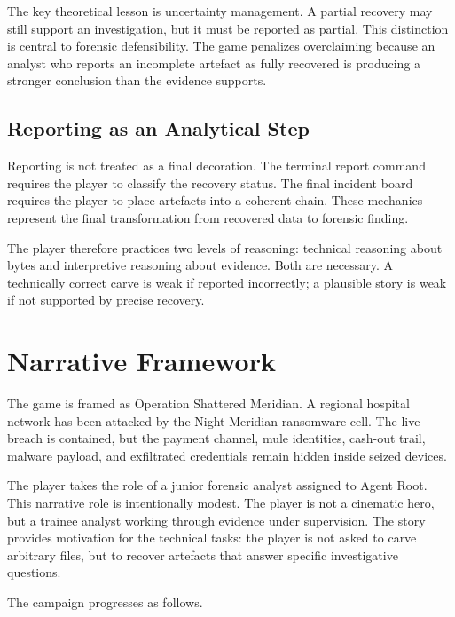 \documentclass[11pt,a4paper]{article}
\begin{document}
The key theoretical lesson is uncertainty management. A partial recovery may still support an investigation, but it must be reported as partial. This distinction is central to forensic defensibility. The game penalizes overclaiming because an analyst who reports an incomplete artefact as fully recovered is producing a stronger conclusion than the evidence supports.

\subsection{Reporting as an Analytical Step}

Reporting is not treated as a final decoration. The terminal report command requires the player to classify the recovery status. The final incident board requires the player to place artefacts into a coherent chain. These mechanics represent the final transformation from recovered data to forensic finding.

The player therefore practices two levels of reasoning: technical reasoning about bytes and interpretive reasoning about evidence. Both are necessary. A technically correct carve is weak if reported incorrectly; a plausible story is weak if not supported by precise recovery.

\section{Narrative Framework}

The game is framed as Operation Shattered Meridian. A regional hospital network has been attacked by the Night Meridian ransomware cell. The live breach is contained, but the payment channel, mule identities, cash-out trail, malware payload, and exfiltrated credentials remain hidden inside seized devices.

The player takes the role of a junior forensic analyst assigned to Agent Root. This narrative role is intentionally modest. The player is not a cinematic hero, but a trainee analyst working through evidence under supervision. The story provides motivation for the technical tasks: the player is not asked to carve arbitrary files, but to recover artefacts that answer specific investigative questions.

The campaign progresses as follows.
\end{document}
